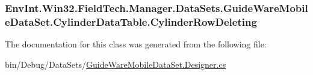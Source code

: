 \subsubsection[{Cylinder\+Row\+Deleting}]{ Env\+Int.\+Win32.\+Field\+Tech.\+Manager.\+Data\+Sets.\+Guide\+Ware\+Mobile\+Data\+Set.\+Cylinder\+Data\+Table.\+Cylinder\+Row\+Deleting}\label{class_env_int_1_1_win32_1_1_field_tech_1_1_manager_1_1_data_sets_1_1_guide_ware_mobile_data_set_1_1_cylinder_data_table_a5cd4bea0475f58566ab5941e537bca73}


The documentation for this class was generated from the following file\+:\begin{DoxyCompactItemize}
\item 
bin/\+Debug/\+Data\+Sets/\hyperlink{bin_2_debug_2_data_sets_2_guide_ware_mobile_data_set_8_designer_8cs}{Guide\+Ware\+Mobile\+Data\+Set.\+Designer.\+cs}\end{DoxyCompactItemize}
